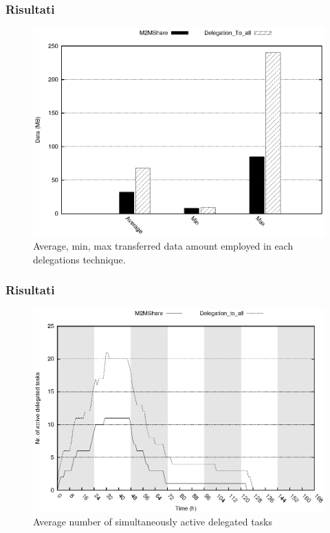 \documentclass{beamer}
\begin{document}
\begin{frame}
\frametitle{Risultati}
\begin{center}
\begin{figure}[ht]
\includegraphics[scale=0.7]{../grafici/data.eps}
\caption{Average, min, max transferred data amount employed in each delegations technique.}
\end{figure}
\end{center}
\end{frame}

\begin{frame}
\frametitle{Risultati}
\begin{center}
\begin{figure}[ht]
\includegraphics[scale=0.7]{../grafici/delegheAttive.eps}
\caption{Average number of simultaneously active delegated tasks}
\end{figure}
\end{center}
\end{frame}
\end{document}
